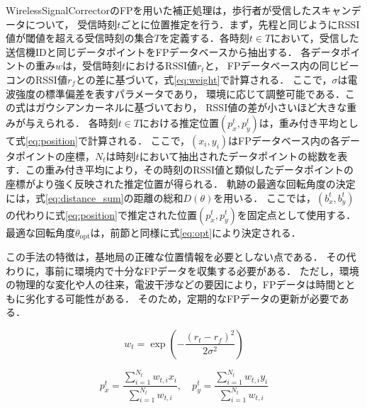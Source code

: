 WirelessSignalCorrectorのFPを用いた補正処理は，歩行者が受信したスキャンデータについて，
受信時刻$t$ごとに位置推定を行う．まず，先程と同じようにRSSI値が閾値を超える受信時刻の集合$T$を定義する．各時刻$t \in T$において，受信した送信機IDと同じデータポイントをFPデータベースから抽出する．
各データポイントの重み$w$は，受信時刻$t$におけるRSSI値$r_t$と，
FPデータベース内の同じビーコンのRSSI値$r_f$との差に基づいて，式\eqref{eq:weight}で計算される．
ここで，$\sigma$は電波強度の標準偏差を表すパラメータであり，
環境に応じて調整可能である．この式はガウシアンカーネルに基づいており，
RSSI値の差が小さいほど大きな重みが与えられる．
各時刻$t \in T$における推定位置$(p_x^t, p_y^t)$は，重み付き平均として式\eqref{eq:position}で計算される．
ここで，$(x_i, y_i)$はFPデータベース内の各データポイントの座標，$N_t$は時刻$t$において抽出されたデータポイントの総数を表す．この重み付き平均により，その時刻のRSSI値と類似したデータポイントの座標がより強く反映された推定位置が得られる．
軌跡の最適な回転角度の決定には，式\eqref{eq:distance_sum}の距離の総和$D(\theta)$を用いる．
ここでは，$(b_x^t, b_y^t)$の代わりに式\eqref{eq:position}で推定された位置$(p_x^t, p_y^t)$を固定点として使用する．
最適な回転角度$\theta_{\mathrm{opt}}$は，前節と同様に式\eqref{eq:opt}により決定される．

この手法の特徴は，基地局の正確な位置情報を必要としない点である．
その代わりに，事前に環境内で十分なFPデータを収集する必要がある．
ただし，環境の物理的な変化や人の往来，電波干渉などの要因により，FPデータは時間とともに劣化する可能性がある．
そのため，定期的なFPデータの更新が必要である．

\begin{equation}
\label{eq:weight}
w_t = \exp\left(-\frac{(r_t - r_f)^2}{2\sigma^2}\right)
\end{equation}

\begin{equation}
\label{eq:position}
p_x^t = \frac{\sum_{i=1}^{N_t} w_{t,i} x_i}{\sum_{i=1}^{N_t} w_{t,i}}, \quad
p_y^t = \frac{\sum_{i=1}^{N_t} w_{t,i} y_i}{\sum_{i=1}^{N_t} w_{t,i}}
\end{equation}


